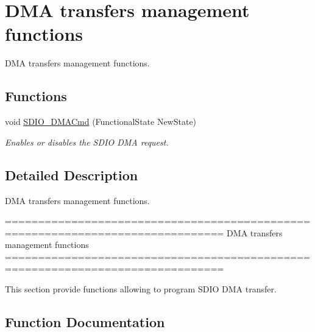 \hypertarget{group___s_d_i_o___group6}{}\section{D\+M\+A transfers management functions}
\label{group___s_d_i_o___group6}


D\+M\+A transfers management functions.  


\subsection*{Functions}
\begin{DoxyCompactItemize}
\item 
void \hyperlink{group___s_d_i_o___group6_gad36fde5ec0ce0c2089b9d971c2271e6e}{S\+D\+I\+O\+\_\+\+D\+M\+A\+Cmd} (Functional\+State New\+State)
\begin{DoxyCompactList}\small\item\em Enables or disables the S\+D\+I\+O D\+M\+A request. \end{DoxyCompactList}\end{DoxyCompactItemize}


\subsection{Detailed Description}
D\+M\+A transfers management functions. 

\begin{DoxyVerb} ===============================================================================
              DMA transfers management functions
 ===============================================================================  

  This section provide functions allowing to program SDIO DMA transfer.\end{DoxyVerb}
 

\subsection{Function Documentation}
\hypertarget{group___s_d_i_o___group6_gad36fde5ec0ce0c2089b9d971c2271e6e}{}
